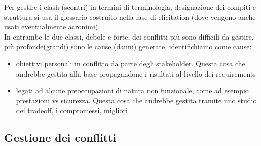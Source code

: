 Per gestire i clash (scontri) in termini di terminologia, designazione dei compiti e struttura si usa il glossario costruito nella fase di elicitation (dove vengono anche usati eventualmente acronimi).\\
In entrambe le due classi, debole e forte, dei conflitti più sono difficili da gestire, più profonde(grandi) sono le cause (danni) generate, identifichiamo come cause:
\begin{itemize}
  \item obiettivi personali in conflitto da parte degli stakeholder. Questa cosa che andrebbe gestita alla base propagandone i risultati al livello dei requirements
  \item legati ad alcune preoccupazioni di natura non funzionale, come ad esempio prestazioni vs sicurezza. Questa cosa che andrebbe gestita tramite uno studio dei tradeoff, i compromessi, migliori
\end{itemize}

\subsection{Gestione dei conflitti}

